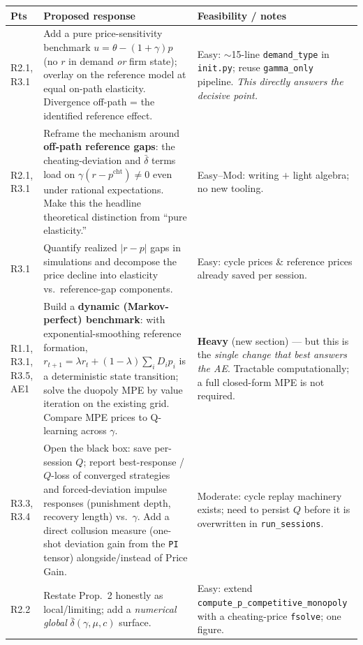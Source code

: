 \documentclass[11pt]{article}
\newcommand{\crit}[1]{\textcolor{crit}{\textbf{#1}}}
\newcommand{\med}[1]{\textcolor{med}{#1}}
\newcommand{\ok}[1]{\textcolor{ok}{#1}}
\begin{document}
\renewcommand{\arraystretch}{1.3}
\begin{longtable}{@{}p{}p{}p{}@{}}
\toprule
\textbf{Pts} & \textbf{Proposed response} & \textbf{Feasibility / notes} \\
\midrule
\endhead
R2.1, R3.1 &
Add a pure price-sensitivity benchmark $u=\theta-(1+\gamma)p$ (no $r$ in demand \emph{or} firm state);
overlay on the reference model at equal on-path elasticity. Divergence off-path = the identified
reference effect. &
\ok{Easy}: $\sim$15-line \texttt{demand\_type} in \texttt{init.py}; reuse \texttt{gamma\_only} pipeline.
\emph{This directly answers the decisive point.} \\

R2.1, R3.1 &
Reframe the mechanism around \textbf{off-path reference gaps}: the cheating-deviation and $\bar\delta$
terms load on $\gamma(r-p^{\text{cht}})\neq 0$ even under rational expectations. Make this the headline
theoretical distinction from ``pure elasticity.'' &
\ok{Easy--\med{Mod}}: writing $+$ light algebra; no new tooling. \\

R3.1 &
Quantify realized $|r-p|$ gaps in simulations and decompose the price decline into elasticity vs.\
reference-gap components. &
\ok{Easy}: cycle prices \& reference prices already saved per session. \\

R1.1, R3.1, R3.5, AE1 &
Build a \textbf{dynamic (Markov-perfect) benchmark}: with exponential-smoothing reference formation,
$r_{t+1}=\lambda r_t+(1-\lambda)\sum_i D_i p_i$ is a deterministic state transition; solve the duopoly
MPE by value iteration on the existing grid. Compare MPE prices to Q-learning across $\gamma$. &
\crit{Heavy} (new section) --- but this is the \emph{single change that best answers the AE}. Tractable
computationally; a full closed-form MPE is not required. \\

R3.3, R3.4 &
Open the black box: save per-session $Q$; report best-response / $Q$-loss of converged strategies and
forced-deviation impulse responses (punishment depth, recovery length) vs.\ $\gamma$. Add a direct
collusion measure (one-shot deviation gain from the \texttt{PI} tensor) alongside/instead of Price Gain. &
\med{Moderate}: cycle replay machinery exists; need to persist $Q$ before it is overwritten in
\texttt{run\_sessions}. \\

R2.2 &
Restate Prop.~2 honestly as local/limiting; add a \emph{numerical global} $\bar\delta(\gamma,\mu,c)$
surface. &
\ok{Easy}: extend \texttt{compute\_p\_competitive\_monopoly} with a cheating-price \texttt{fsolve}; one figure. \\


\end{longtable}
\end{document}
